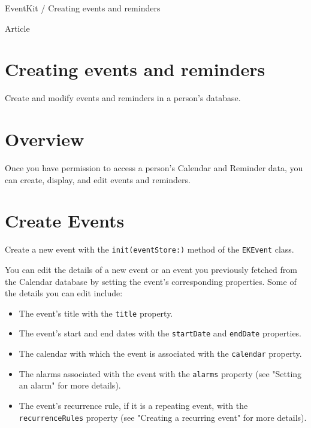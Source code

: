 \documentclass{article}
\title{}
\author{}
\date{}
\begin{document}
EventKit / Creating events and reminders

Article

\section*{Creating events and reminders}
Create and modify events and reminders in a person's database.

\section*{Overview}
Once you have permission to access a person's Calendar and Reminder data, you can create, display, and edit events and reminders.

\section*{Create Events}
Create a new event with the \texttt{init(eventStore:)} method of the \texttt{EKEvent} class.

You can edit the details of a new event or an event you previously fetched from the Calendar database by setting the event's corresponding properties. Some of the details you can edit include:

\begin{itemize}
    \item The event's title with the \texttt{title} property.
    \item The event's start and end dates with the \texttt{startDate} and \texttt{endDate} properties.
    \item The calendar with which the event is associated with the \texttt{calendar} property.
    \item The alarms associated with the event with the \texttt{alarms} property (see "Setting an alarm" for more details).
    \item The event's recurrence rule, if it is a repeating event, with the \texttt{recurrenceRules} property (see "Creating a recurring event" for more details).
\end{itemize}

\noindent{}
\end{document}
